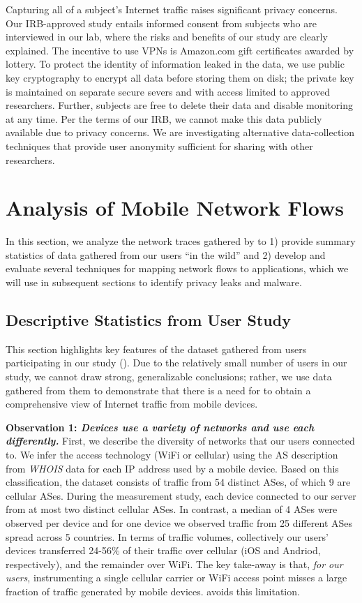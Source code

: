 Capturing all of a subject's Internet traffic raises significant
privacy concerns.  Our IRB-approved study entails informed consent
from subjects who are interviewed in our lab, where the risks and
benefits of our study are clearly explained.  The incentive to use
VPNs is Amazon.com gift certificates awarded by lottery. To protect the
identity of information leaked in the data, we use public key
cryptography to encrypt all data before storing them 
on disk; the private key is
maintained on separate secure severs and with access limited to
approved researchers.  Further, subjects are free to delete their
data and disable monitoring at any time.  Per the terms of our IRB, we cannot 
make this data publicly available due to privacy concerns. We are investigating 
alternative data-collection techniques that provide user anonymity sufficient 
for sharing with other researchers.

\section{Analysis of Mobile Network Flows}
In this section, we analyze the network traces gathered by \meddle to 
1) provide summary statistics of data gathered from our 
users ``in the wild'' and
2) develop and evaluate several techniques for mapping network flows to 
applications, which we will use in subsequent sections to identify privacy 
leaks and malware.


\subsection{Descriptive Statistics from User Study}

This section highlights key features of the dataset gathered from 
users participating in our study (\mobWild). 
Due to the relatively small number of users in our study, we cannot 
draw strong, generalizable conclusions; rather, we use data gathered 
from them to demonstrate that there is a need for \platname{} to 
obtain a comprehensive view of Internet traffic from mobile devices. 

\noindent\textbf{Observation 1: \emph{Devices use a variety of networks and use each differently.}} First, we describe the diversity 
of networks that our users connected to. 
We infer the access technology (WiFi or cellular) using the AS description from \emph{WHOIS} data for each IP address used by a mobile device.
Based on this classification, the \mobWild dataset consists of traffic from 54 distinct ASes, of which 9 are cellular ASes.
During the measurement study, each device connected to our \platname server from at most two distinct cellular ASes. 
In contrast, a median of 4 \wifi ASes were observed per device and for one device we observed traffic from 25 different \wifi ASes spread across 5 countries.
In terms of traffic volumes, collectively our users' devices transferred 24-56\% of their traffic over cellular (iOS and Andriod, respectively), and the 
remainder over WiFi. 
The key take-away is that, \emph{for our users}, instrumenting a single cellular carrier or WiFi access point misses a 
large fraction of traffic generated by mobile devices. \platname{} avoids this limitation.

